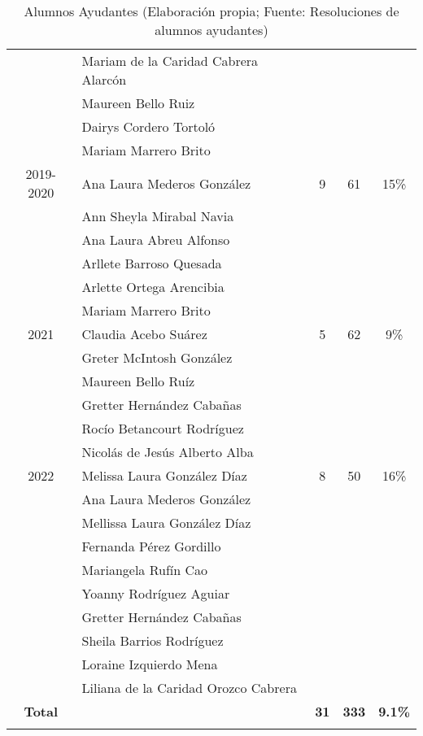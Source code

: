 \begin{longtable}{|c|p{7cm}|c|c|c|}
	\cline{2-2}
	& Mariam de la Caridad Cabrera Alarcón& & & \\
	\cline{2-2}
	& Maureen Bello Ruiz& & & \\
	\cline{2-2}
	& Dairys Cordero Tortoló& & & \\
	\cline{2-2}
	& Mariam Marrero Brito& & & \\
	\hline
	2019-2020& Ana Laura Mederos González& 9 & 61 & 15\% \\
	\cline{2-2}
	& Ann Sheyla Mirabal Navia& & & \\
	\cline{2-2}
	& Ana Laura Abreu Alfonso& & & \\
	\cline{2-2}
	& Arllete Barroso Quesada& & & \\
	\cline{2-2}
	& Arlette Ortega Arencibia& & & \\
	\cline{2-2}
	& Mariam Marrero Brito& & & \\
	\hline
	
	2021& Claudia Acebo Suárez& 5 & 62 & 9\% \\

	\cline{2-2}
	& Greter McIntosh González & & & \\

	\cline{2-2}
	& Maureen Bello Ruíz& & & \\
	\cline{2-2}
	& Gretter Hernández Cabañas& & & \\
	\cline{2-2}
	& Rocío Betancourt Rodríguez& & & \\
	\cline{2-2}
	& Nicolás de Jesús Alberto Alba& & & \\
	\hline
	2022& Melissa Laura González Díaz& 8 & 50 &  16\%\\
	\cline{2-2}
	& Ana Laura Mederos González & & & \\
	\cline{2-2}
	& Mellissa Laura González Díaz& & & \\
	\cline{2-2}
	& Fernanda Pérez Gordillo& & & \\
	\cline{2-2}
	& Mariangela Rufín Cao& & & \\
	\cline{2-2}
	& Yoanny Rodríguez Aguiar& & & \\
	\cline{2-2}
	& Gretter Hernández Cabañas& & & \\
	\cline{2-2}
	& Sheila Barrios Rodríguez& & & \\
	\cline{2-2}
	& Loraine Izquierdo Mena& & & \\
	\cline{2-2}
	& Liliana de la Caridad Orozco Cabrera & & & \\
	\hline
	\textbf{Total}& & \textbf{31}& \textbf{333} & \textbf{9.1\%} \\
	\hline
	
	\caption{Alumnos Ayudantes (Elaboración propia; Fuente: Resoluciones de alumnos ayudantes)}
	\label{tab:AlumnosAyudantes}
\end{longtable}

